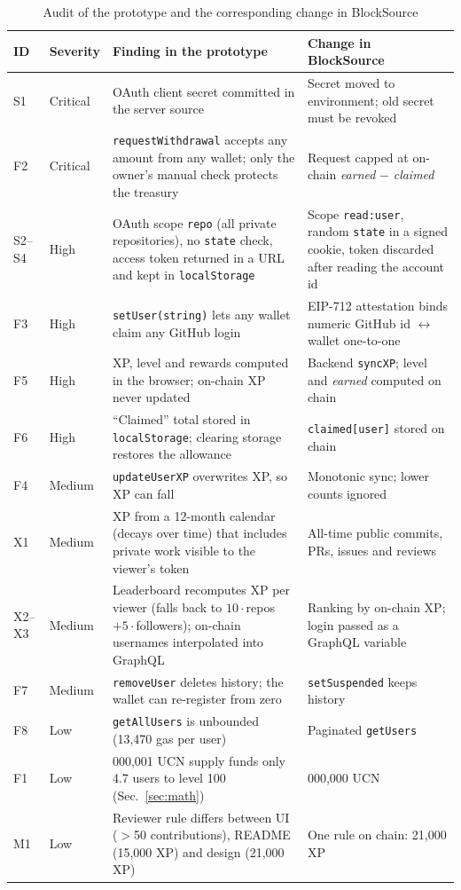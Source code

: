 \documentclass[conference]{IEEEtran}
\begin{document}
\begin{table}[t]
\centering
\caption{Audit of the prototype and the corresponding change in BlockSource}
\label{tab:audit}
\footnotesize
\setlength{\tabcolsep}{4pt}
\begin{tabular}{@{}l l >{\raggedright\arraybackslash}p{7.6cm} >{\raggedright\arraybackslash}p{6.0cm}@{}}
\toprule
\textbf{ID} & \textbf{Severity} & \textbf{Finding in the prototype} & \textbf{Change in BlockSource}\\
\midrule
S1 & Critical & OAuth client secret committed in the server source & Secret moved to environment; old secret must be revoked\\
F2 & Critical & \texttt{requestWithdrawal} accepts any amount from any wallet; only the owner's manual check protects the treasury & Request capped at on-chain \emph{earned} $-$ \emph{claimed}\\
S2--S4 & High & OAuth scope \texttt{repo} (all private repositories), no \texttt{state} check, access token returned in a URL and kept in \texttt{localStorage} & Scope \texttt{read:user}, random \texttt{state} in a signed cookie, token discarded after reading the account id\\
F3 & High & \texttt{setUser(string)} lets any wallet claim any GitHub login & EIP-712 attestation binds numeric GitHub id $\leftrightarrow$ wallet one-to-one\\
F5 & High & XP, level and rewards computed in the browser; on-chain XP never updated & Backend \texttt{syncXP}; level and \emph{earned} computed on chain\\
F6 & High & ``Claimed'' total stored in \texttt{localStorage}; clearing storage restores the allowance & \texttt{claimed[user]} stored on chain\\
F4 & Medium & \texttt{updateUserXP} overwrites XP, so XP can fall & Monotonic sync; lower counts ignored\\
X1 & Medium & XP from a 12-month calendar (decays over time) that includes private work visible to the viewer's token & All-time public commits, PRs, issues and reviews\\
X2--X3 & Medium & Leaderboard recomputes XP per viewer (falls back to $10\cdot$repos$+5\cdot$followers); on-chain usernames interpolated into GraphQL & Ranking by on-chain XP; login passed as a GraphQL variable\\
F7 & Medium & \texttt{removeUser} deletes history; the wallet can re-register from zero & \texttt{setSuspended} keeps history\\
F8 & Low & \texttt{getAllUsers} is unbounded (13{,}470 gas per user) & Paginated \texttt{getUsers}\\
F1 & Low & 1{,}000{,}001 UCN supply funds only 4.7 users to level 100 (Sec.~\ref{sec:math}) & 100{,}000{,}000 UCN\\
M1 & Low & Reviewer rule differs between UI ($>$50 contributions), README (15{,}000 XP) and design (21{,}000 XP) & One rule on chain: 21{,}000 XP\\
\bottomrule
\end{tabular}
\end{table}
\end{document}
